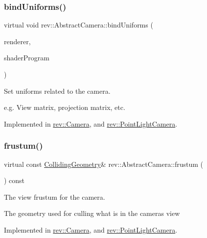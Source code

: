 \subsubsection{\texorpdfstring{bindUniforms()}{bindUniforms()}}
{\footnotesize\ttfamily virtual void rev\+::\+Abstract\+Camera\+::bind\+Uniforms (\begin{DoxyParamCaption}\item[{const \mbox{\hyperlink{classrev_1_1_main_renderer}{Main\+Renderer}} $\ast$}]{renderer,  }\item[{\mbox{\hyperlink{classrev_1_1_shader_program}{Shader\+Program}} $\ast$}]{shader\+Program }\end{DoxyParamCaption})\hspace{0.3cm}{\ttfamily [pure virtual]}}



Set uniforms related to the camera. 

e.\+g. View matrix, projection matrix, etc. 

Implemented in \mbox{\hyperlink{classrev_1_1_camera_aacdb899dc9745568b6c45240fd114e7d}{rev\+::\+Camera}}, and \mbox{\hyperlink{classrev_1_1_point_light_camera_a461e93ecc428b95ad7b7a244e143f924}{rev\+::\+Point\+Light\+Camera}}.

\mbox{\label{classrev_1_1_abstract_camera_a3bc8bb701690f7e67404a78cfb360708}} 
\subsubsection{\texorpdfstring{frustum()}{frustum()}}
{\footnotesize\ttfamily virtual const \mbox{\hyperlink{classrev_1_1_colliding_geometry}{Colliding\+Geometry}}\& rev\+::\+Abstract\+Camera\+::frustum (\begin{DoxyParamCaption}{ }\end{DoxyParamCaption}) const\hspace{0.3cm}{\ttfamily [pure virtual]}}



The view frustum for the camera. 

The geometry used for culling what is in the camera\textquotesingle{}s view 

Implemented in \mbox{\hyperlink{classrev_1_1_camera_afc7ce1c13f50a84a2d858913a65b4cd8}{rev\+::\+Camera}}, and \mbox{\hyperlink{classrev_1_1_point_light_camera_a74ce57f46a3a367cc9b41a499b9996e5}{rev\+::\+Point\+Light\+Camera}}.

